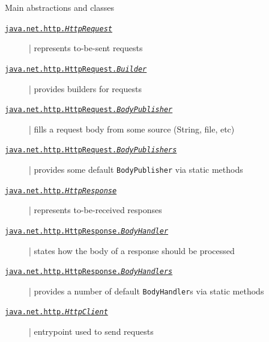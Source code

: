 \documentclass[presentation]{beamer}\mode<presentation>{\usetheme{AMSBolognaFC}}
\begin{document}
\begin{frame}[allowframebreaks]
    \begin{block}{Main abstractions and classes}
        \begin{description}
            \item[\href{https://docs.oracle.com/en/java/javase/15/docs/api/java.net.http/java/net/http/HttpRequest.html}{\texttt{java.net.http.\textit{HttpRequest}}}] | represents to-be-sent requests
            \item[\href{https://docs.oracle.com/en/java/javase/15/docs/api/java.net.http/java/net/http/HttpRequest.Builder.html}{\texttt{java.net.http.HttpRequest.\textit{Builder}}}] | provides builders for requests
            \item[\href{https://docs.oracle.com/en/java/javase/15/docs/api/java.net.http/java/net/http/HttpRequest.BodyPublisher.html}{\texttt{java.net.http.HttpRequest.\textit{BodyPublisher}}}] | fills a request body from some source (String, file, etc)
            \item[\href{https://docs.oracle.com/en/java/javase/15/docs/api/java.net.http/java/net/http/HttpRequest.BodyPublishers.html}{\texttt{java.net.http.HttpRequest.\textit{BodyPublishers}}}] | provides some default \texttt{BodyPublisher} via static methods
            \item[\href{https://docs.oracle.com/en/java/javase/15/docs/api/java.net.http/java/net/http/HttpResponse.html}{\texttt{java.net.http.\textit{HttpResponse}}}] | represents to-be-received responses
            \item[\href{https://docs.oracle.com/en/java/javase/15/docs/api/java.net.http/java/net/http/HttpResponse.BodyHandler.html}{\texttt{java.net.http.HttpResponse.\textit{BodyHandler}}}] | states how the body of a response should be processed
            \item[\href{https://docs.oracle.com/en/java/javase/15/docs/api/java.net.http/java/net/http/HttpResponse.BodyHandlers.html}{\texttt{java.net.http.HttpResponse.\textit{BodyHandlers}}}] | provides a number of default \texttt{BodyHandler}s via static methods
            \item[\href{https://docs.oracle.com/en/java/javase/15/docs/api/java.net.http/java/net/http/HttpClient.html}{\texttt{java.net.http.\textit{HttpClient}}}] | entrypoint used to send requests
        \end{description}
    \end{block}




\end{frame}
\end{document}
